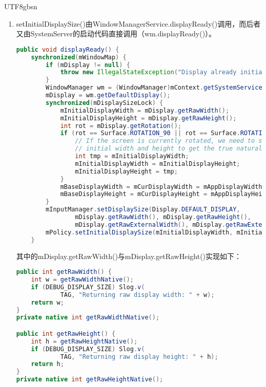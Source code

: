 \documentclass[a4paper,11pt]{article}
\begin{document}
\begin{CJK*}{UTF8}{gbsn}
\begin{enumerate}
    \item setInitialDisplaySize()由WindowManagerService.displayReady()调用，而后者
    又由SystemServer的启动代码直接调用（wm.displayReady()）。
\begin{lstlisting}[language=JAVA]
public void displayReady() {
    synchronized(mWindowMap) {
        if (mDisplay != null) {
            throw new IllegalStateException("Display already initialized");
        }
        WindowManager wm = (WindowManager)mContext.getSystemService(Context.WINDOW_SERVICE);
        mDisplay = wm.getDefaultDisplay();
        synchronized(mDisplaySizeLock) {
            mInitialDisplayWidth = mDisplay.getRawWidth();
            mInitialDisplayHeight = mDisplay.getRawHeight();
            int rot = mDisplay.getRotation();
            if (rot == Surface.ROTATION_90 || rot == Surface.ROTATION_270) {
                // If the screen is currently rotated, we need to swap the
                // initial width and height to get the true natural values.
                int tmp = mInitialDisplayWidth;
                mInitialDisplayWidth = mInitialDisplayHeight;
                mInitialDisplayHeight = tmp;
            }
            mBaseDisplayWidth = mCurDisplayWidth = mAppDisplayWidth = mInitialDisplayWidth;
            mBaseDisplayHeight = mCurDisplayHeight = mAppDisplayHeight = mInitialDisplayHeight;
        }
        mInputManager.setDisplaySize(Display.DEFAULT_DISPLAY,
                mDisplay.getRawWidth(), mDisplay.getRawHeight(),
                mDisplay.getRawExternalWidth(), mDisplay.getRawExternalHeight());
        mPolicy.setInitialDisplaySize(mInitialDisplayWidth, mInitialDisplayHeight);                                                                                                       
    }
\end{lstlisting}
        其中的mDisplay.getRawWidth()与mDisplay.getRawHeight()实现如下：
\begin{lstlisting}[language=JAVA]
public int getRawWidth() {
    int w = getRawWidthNative();
    if (DEBUG_DISPLAY_SIZE) Slog.v(
            TAG, "Returning raw display width: " + w);                                                                                                                                    
    return w;
}   
private native int getRawWidthNative();

public int getRawHeight() {
    int h = getRawHeightNative();
    if (DEBUG_DISPLAY_SIZE) Slog.v(
            TAG, "Returning raw display height: " + h); 
    return h;
}   
private native int getRawHeightNative();


\end{lstlisting}
\end{enumerate}
\end{CJK*}
\end{document}
